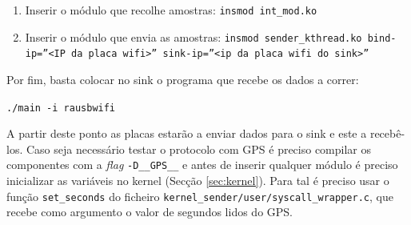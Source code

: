 \documentclass[10pt,a4paper,oneside]{book}
\begin{document}
	\begin{enumerate}
		\item Inserir o módulo que recolhe amostras: {\tt insmod int\_mod.ko}
		\item Inserir o módulo que envia as amostras: {\tt insmod  sender\_kthread.ko bind-ip=''<IP da placa wifi>''  sink-ip=''<ip da placa wifi do sink>''}
	\end{enumerate}
	
	Por fim, basta colocar no sink o programa que recebe os dados a correr:
	
	\begin{center}
		{\tt ./main -i rausbwifi}
	\end{center}
	
	A partir deste ponto as placas estarão a enviar dados para o sink e este a recebê-los. Caso seja necessário testar o protocolo com GPS é preciso compilar os componentes com a \emph{flag} {\tt -D\_\_GPS\_\_} e antes de inserir qualquer módulo é preciso inicializar as variáveis no kernel (Secção \ref{sec:kernel}). Para tal é preciso usar o função {\tt set\_seconds} do ficheiro {\tt kernel\_sender/user/syscall\_wrapper.c}, que recebe como argumento o valor de segundos lidos do GPS.
	
\end{document}
